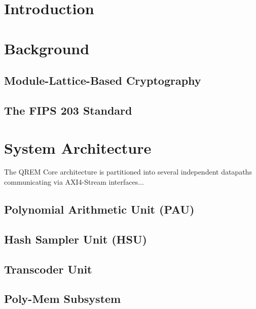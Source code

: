 \documentclass[conference]{IEEEtran}
\begin{document}
\section{Introduction}

\section{Background}
\subsection{Module-Lattice-Based Cryptography}

\subsection{The FIPS 203 Standard}

\section{System Architecture}
The QREM Core architecture is partitioned into several independent datapaths communicating via AXI4-Stream interfaces...

\subsection{Polynomial Arithmetic Unit (PAU)}

\subsection{Hash Sampler Unit (HSU)}

\subsection{Transcoder Unit}

\subsection{Poly-Mem Subsystem}
\end{document}

